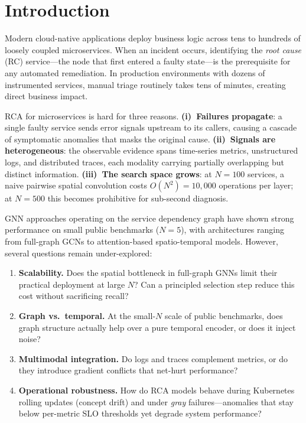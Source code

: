 \documentclass[11pt,a4paper]{article}
\begin{document}
\section{Introduction}
\label{sec:intro}

Modern cloud-native applications deploy business logic across tens to hundreds
of loosely coupled microservices. When an incident occurs, identifying the
\emph{root cause} (RC) service---the node that first entered a faulty
state---is the prerequisite for any automated remediation. In production
environments with dozens of instrumented services, manual triage routinely
takes tens of minutes, creating direct business impact.

RCA for microservices is hard for three reasons.
\textbf{(i)~Failures propagate}: a single faulty service sends error signals
upstream to its callers, causing a cascade of symptomatic anomalies that
masks the original cause. \textbf{(ii)~Signals are heterogeneous}: the
observable evidence spans time-series metrics, unstructured logs, and
distributed traces, each modality carrying partially overlapping but distinct
information. \textbf{(iii)~The search space grows}: at $N{=}100$ services, a
naive pairwise spatial convolution costs $O(N^2)\!=\!10{,}000$ operations per
layer; at $N{=}500$ this becomes prohibitive for sub-second diagnosis.

GNN approaches operating on the service dependency graph have shown strong
performance on small public benchmarks ($N\!=\!5$), with architectures ranging
from full-graph GCNs to attention-based spatio-temporal models. However,
several questions remain under-explored:

\begin{enumerate}
  \item \textbf{Scalability.} Does the spatial bottleneck in full-graph GNNs
  limit their practical deployment at large $N$? Can a principled selection
  step reduce this cost without sacrificing recall?
  \item \textbf{Graph vs.\ temporal.} At the small-$N$ scale of public
  benchmarks, does graph structure actually help over a pure temporal encoder,
  or does it inject noise?
  \item \textbf{Multimodal integration.} Do logs and traces complement
  metrics, or do they introduce gradient conflicts that net-hurt performance?
  \item \textbf{Operational robustness.} How do RCA models behave during
  Kubernetes rolling updates (concept drift) and under \emph{gray}
  failures---anomalies that stay below per-metric SLO thresholds yet degrade
  system performance?
\end{enumerate}
\end{document}
